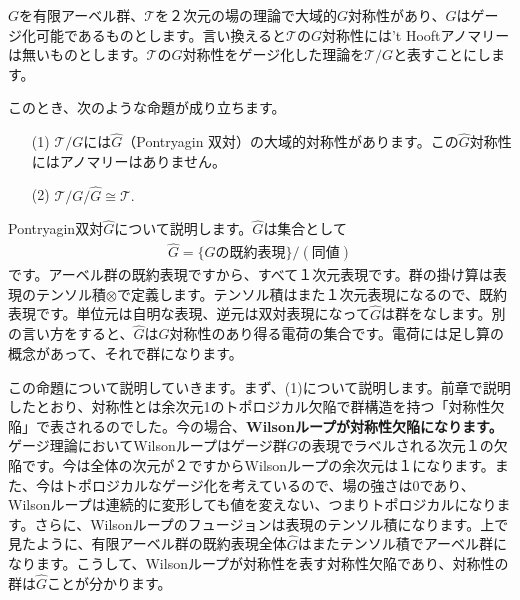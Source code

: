 \documentclass[report,paper=a4, fontsize=12pt, line_length=16cm, number_of_lines=33,dvipdfmx]{jlreq}
\newcommand{\kyou}[1]{{\sffamily \bfseries #1}}
\numberwithin{equation}{chapter}
\newcommand{\Gh}{\widehat{G}}
\newcommand{\Tcal}{\mathcal{T}}
\begin{document}
$G$を有限アーベル群、$\Tcal$を２次元の場の理論で大域的$G$対称性があり、$G$はゲージ化可能であるものとします。言い換えると$\Tcal$の$G$対称性には't Hooftアノマリーは無いものとします。$\Tcal$の$G$対称性をゲージ化した理論を$\Tcal/G$と表すことにします。

このとき、次のような命題が成り立ちます。
\begin{proposition}[命題]
  \begin{enumerate}
    \item[(1)] $\Tcal/G$には$\Gh$（Pontryagin 双対）の大域的対称性があります。この$\Gh$対称性にはアノマリーはありません。
    \item[(2)] $\Tcal/G/\Gh \cong \Tcal.$
  \end{enumerate}      
\end{proposition}
Pontryagin双対$\Gh$について説明します。$\Gh$は集合として
\begin{align}
  \Gh=\{G\text{の既約表現}\}/(\text{同値})
\end{align}
です。アーベル群の既約表現ですから、すべて１次元表現です。群の掛け算は表現のテンソル積$\otimes$で定義します。テンソル積はまた１次元表現になるので、既約表現です。単位元は自明な表現、逆元は双対表現になって$\Gh$は群をなします。別の言い方をすると、$\Gh$は$G$対称性のあり得る電荷の集合です。電荷には足し算の概念があって、それで群になります。

この命題について説明していきます。まず、(1)について説明します。前章で説明したとおり、対称性とは余次元1のトポロジカル欠陥で群構造を持つ「対称性欠陥」で表されるのでした。今の場合、\kyou{Wilsonループが対称性欠陥になります。}ゲージ理論においてWilsonループはゲージ群$G$の表現でラベルされる次元１の欠陥です。今は全体の次元が２ですからWilsonループの余次元は１になります。また、今はトポロジカルなゲージ化を考えているので、場の強さは$0$であり、Wilsonループは連続的に変形しても値を変えない、つまりトポロジカルになります。さらに、Wilsonループのフュージョンは表現のテンソル積になります。上で見たように、有限アーベル群の既約表現全体$\Gh$はまたテンソル積でアーベル群になります。こうして、Wilsonループが対称性を表す対称性欠陥であり、対称性の群は$\Gh$ことが分かります。
\end{document}
